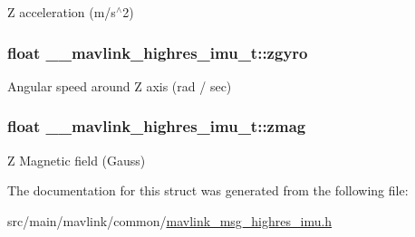 Z acceleration (m/s$^\wedge$2) 

\hypertarget{struct____mavlink__highres__imu__t_a3e5d5462ef68fe4fea7811c082ddb186}{
\subsubsection[{zgyro}]{\setlength{\rightskip}{0pt plus 5cm}float \+\_\+\+\_\+mavlink\+\_\+highres\+\_\+imu\+\_\+t\+::zgyro}}\label{struct____mavlink__highres__imu__t_a3e5d5462ef68fe4fea7811c082ddb186}


Angular speed around Z axis (rad / sec) 

\hypertarget{struct____mavlink__highres__imu__t_abf5f119c9468cfaeb83d757997024a57}{
\subsubsection[{zmag}]{\setlength{\rightskip}{0pt plus 5cm}float \+\_\+\+\_\+mavlink\+\_\+highres\+\_\+imu\+\_\+t\+::zmag}}\label{struct____mavlink__highres__imu__t_abf5f119c9468cfaeb83d757997024a57}


Z Magnetic field (Gauss) 



The documentation for this struct was generated from the following file\+:\begin{DoxyCompactItemize}
\item 
src/main/mavlink/common/\hyperlink{mavlink__msg__highres__imu_8h}{mavlink\+\_\+msg\+\_\+highres\+\_\+imu.\+h}\end{DoxyCompactItemize}
